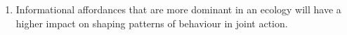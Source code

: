 \begin{CJK}{UTF8}{gbsn}
\begin{enumerate}
      \item Informational affordances that are more dominant in an ecology will have a higher impact on shaping patterns of behaviour in joint action.

    \end{enumerate}











































































  \end{CJK}
